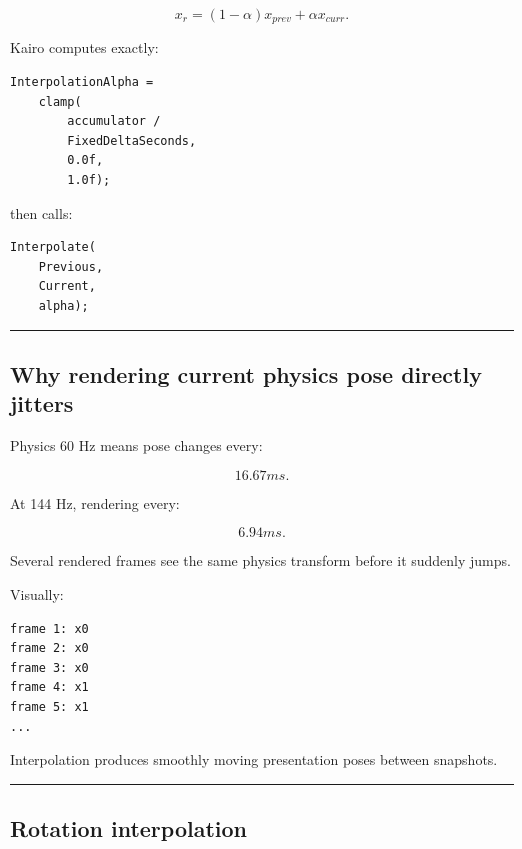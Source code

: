 \[
\boxed{
x_r
=
(1-\alpha)x_{prev}
+
\alpha x_{curr}.
}
\]

Kairo computes exactly:

\begin{verbatim}
InterpolationAlpha =
    clamp(
        accumulator /
        FixedDeltaSeconds,
        0.0f,
        1.0f);
\end{verbatim}

then calls:

\begin{verbatim}
Interpolate(
    Previous,
    Current,
    alpha);
\end{verbatim}

\begin{center}\rule{0.5\linewidth}{0.5pt}\end{center}

\subsection{Why rendering current physics pose directly jitters}\label{06-engine-ii-ch037-why-rendering-current-physics-pose-directly-jitters}

\hypertarget{06-engine-ii-ch037-why-rendering-current-physics-pose-directly-jitters}{}

Physics 60 Hz means pose changes every:

\[
16.67ms.
\]

At 144 Hz, rendering every:

\[
6.94ms.
\]

Several rendered frames see the same physics transform before it suddenly jumps.

Visually:

\begin{verbatim}
frame 1: x0
frame 2: x0
frame 3: x0
frame 4: x1
frame 5: x1
...
\end{verbatim}

Interpolation produces smoothly moving presentation poses between snapshots.

\begin{center}\rule{0.5\linewidth}{0.5pt}\end{center}

\subsection{Rotation interpolation}\label{06-engine-ii-ch037-rotation-interpolation}

\hypertarget{06-engine-ii-ch037-rotation-interpolation}{}


